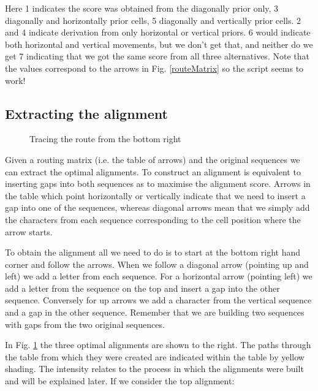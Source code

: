 \documentclass[11pt]{article}
\begin{document}
Here 1 indicates the score was obtained from the diagonally prior only, 3
diagonally and horizontally prior cells, 5 diagonally and vertically prior cells.
2 and 4 indicate derivation from only horizontal or vertical priors.
6 would indicate both horizontal and vertical movements, but we don't get
that, and neither do we get 7 indicating that we got the same score from all
three alternatives. Note that the values correspond to the arrows in Fig. \ref{routeMatrix}
so the script seems to work!  

\subsection{Extracting the alignment}
\label{sec-1-3}
\begin{figure}[ht]
  \begin{tikzpicture}[scale=0.5]
    
  \end{tikzpicture}
  \caption{Tracing the route from the bottom right}
  \label{traceBack}
\end{figure}
Given a routing matrix (i.e. the table of arrows) and the original sequences
we can extract the optimal alignments. To construct an alignment is equivalent
to inserting gaps into both sequences as to maximise the alignment score. Arrows
in the table which point horizontally or vertically indicate that we need to
insert a gap into one of the sequences, whereas diagonal arrows mean that we
simply add the characters from each sequence corresponding to the cell position
where the arrow starts.

To obtain the alignment all we need to do is to start at the bottom right
hand corner and follow the arrows. When we follow a diagonal arrow (pointing
up and left) we add a letter from each sequence. For a horizontal arrow (pointing
left) we add a letter from the sequence on the top and insert a gap into the other
sequence. Conversely for up arrows we add a character from the vertical sequence and
a gap in the other sequence. Remember that we are building two sequences with gaps
from the two original sequences. 

In Fig. \ref{traceBack} the three optimal alignments are shown to the right. The paths
through the table from which they were created are indicated within the table by
yellow shading. The intensity relates to the process in which the alignments were built
and will be explained later. If we consider the top alignment:
\end{document}
